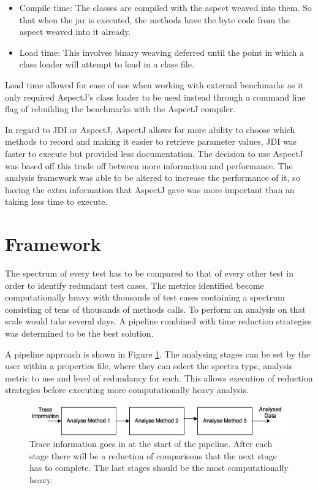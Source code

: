\begin{itemize}
\item Compile time:
The classes are compiled with the aspect weaved into them. So that when the jar is executed, the methods have the byte code from the aspect weaved into it already.
\item Load time:
This involves binary weaving deferred until the point in which a class loader will attempt to load in a class file.
\end{itemize}

Load time allowed for ease of use when working with external benchmarks as it only required AspectJ's class loader to be used instead through a command line flag of rebuilding the benchmarks with the AspectJ compiler.

In regard to JDI or AspectJ, AspectJ allows for more ability to choose which methods to record and making it easier to retrieve parameter values, JDI was faster to execute but provided less documentation. The decision to use AspectJ was based off this trade off between more information and performance. The analysis framework was able to be altered to increase the performance of it, so having the extra information that AspectJ gave was more important than an taking less time to execute.

\section{Framework}
\label{S:framework}

The spectrum of every test has to be compared to that of every other test in order to identify redundant test cases. The metrics identified become computationally heavy with thousands of test cases containing a spectrum consisting of tens of thousands of methods calls. To perform an analysis on that scale would take several days. A pipeline combined with time reduction strategies was determined to be the best solution.

A pipeline approach is shown in Figure \ref{fig:pipeline}. The analysing stages can be set by the user within a properties file, where they can select the spectra type, analysis metric to use and level of redundancy for each. This allows execution of reduction strategies before executing more computationally heavy analysis.

\begin{figure}[h] 
\includegraphics[width=\textwidth]{Pipeline.jpg}
\caption{Trace information goes in at the start of the pipeline. After each stage there will be a reduction of comparisons that the next stage has to complete. The last stages should be the most computationally heavy.}
\label{fig:pipeline}
\end{figure}

